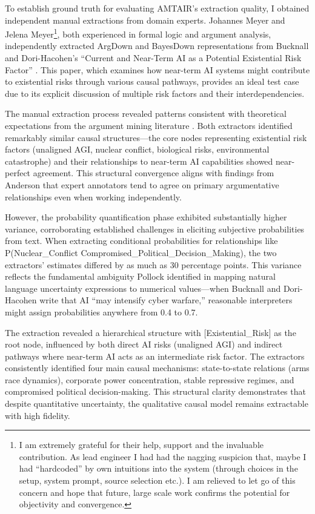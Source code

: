 \documentclass[
  11pt,
  letterpaper,
  openany]{book}
\begin{document}
To establish ground truth for evaluating AMTAIR's extraction quality, I
obtained independent manual extractions from domain experts. Johannes
Meyer and Jelena Meyer\footnote{I am extremely grateful for their help,
  support and the invaluable contribution. As lead engineer I had had
  the nagging suspicion that, maybe I had ``hardcoded'' by own
  intuitions into the system (through choices in the setup, system
  prompt, source selection etc.). I am relieved to let go of this
  concern and hope that future, large scale work confirms the potential
  for objectivity and convergence.}, both experienced in formal logic
and argument analysis, independently extracted ArgDown and BayesDown
representations from Bucknall and Dori-Hacohen's ``Current and Near-Term
AI as a Potential Existential Risk Factor'' \textcite{bucknall2022}.
This paper, which examines how near-term AI systems might contribute to
existential risks through various causal pathways, provides an ideal
test case due to its explicit discussion of multiple risk factors and
their interdependencies.

The manual extraction process revealed patterns consistent with
theoretical expectations from the argument mining literature
\textcite{khartabil2021}. Both extractors identified remarkably similar
causal structures---the core nodes representing existential risk factors
(unaligned AGI, nuclear conflict, biological risks, environmental
catastrophe) and their relationships to near-term AI capabilities showed
near-perfect agreement. This structural convergence aligns with findings
from Anderson \textcite{anderson2007} that expert annotators tend to
agree on primary argumentative relationships even when working
independently.

However, the probability quantification phase exhibited substantially
higher variance, corroborating established challenges in eliciting
subjective probabilities from text. When extracting conditional
probabilities for relationships like P(Nuclear\_Conflict \textbar{}
Compromised\_Political\_Decision\_Making), the two extractors' estimates
differed by as much as 30 percentage points. This variance reflects the
fundamental ambiguity Pollock \textcite{pollock1995} identified in
mapping natural language uncertainty expressions to numerical
values---when Bucknall and Dori-Hacohen write that AI ``may intensify
cyber warfare,'' reasonable interpreters might assign probabilities
anywhere from 0.4 to 0.7.

The extraction revealed a hierarchical structure with
{[}Existential\_Risk{]} as the root node, influenced by both direct AI
risks (unaligned AGI) and indirect pathways where near-term AI acts as
an intermediate risk factor. The extractors consistently identified four
main causal mechanisms: state-to-state relations (arms race dynamics),
corporate power concentration, stable repressive regimes, and
compromised political decision-making. This structural clarity
demonstrates that despite quantitative uncertainty, the qualitative
causal model remains extractable with high fidelity.
\end{document}
